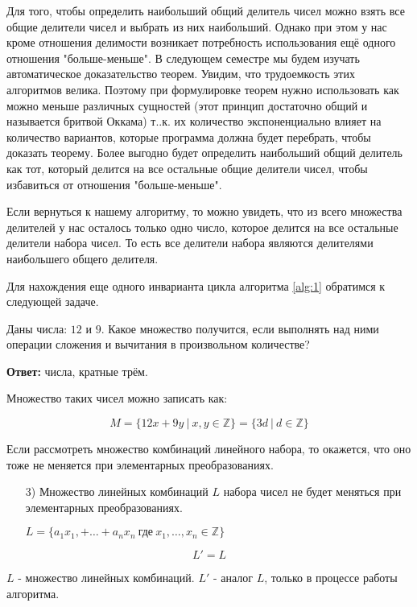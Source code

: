 \documentclass[russian]{lecture-notes}
\begin{document}
\begin{remark}
    Для того, чтобы определить наибольший общий делитель чисел можно взять все общие делители чисел и выбрать из них наибольший. Однако при этом у нас кроме отношения делимости возникает потребность использования ещё одного отношения "больше-меньше". В следующем семестре мы будем изучать автоматическое доказательство теорем. Увидим, что трудоемкость этих алгоритмов велика. Поэтому при формулировке теорем нужно использовать как можно меньше различных сущностей (этот принцип достаточно общий и называется бритвой Оккама) т..к. их количество экспоненциально влияет на количество вариантов, которые программа должна будет перебрать, чтобы доказать теорему.  Более выгодно будет определить наибольший общий делитель как тот, который делится на все остальные общие делители чисел, чтобы избавиться от отношения "больше-меньше".
\end{remark}

Если вернуться к нашему алгоритму, то можно увидеть, что из всего множества делителей у нас осталось только одно число, которое делится на все остальные делители набора чисел. То есть все делители набора являются делителями наибольшего общего делителя.

Для нахождения еще одного инварианта цикла алгоритма \ref{alg:1} обратимся к следующей задаче.

\begin{problem}
    Даны числа: $12$ и $9$. Какое множество получится, если выполнять над ними операции сложения и вычитания в произвольном количестве?
\end{problem}
\noindent \textbf{Ответ:} числа, кратные трём.

Множество таких чисел можно записать как:

\[M = \{12x+9y \ | \ x, y \in \mathbb{Z}\} = \{3d \ | \ d \in \mathbb{Z}\}\]

Если рассмотреть множество комбинаций линейного набора, то окажется, что оно тоже не меняется при элементарных преобразованиях.

\begin{itemize}
    \item[3)] Множество линейных комбинаций $L$ набора чисел не будет меняться при элементарных преобразованиях.

    \emph{$L = \{a_1x_1,+\ldots+a_nx_n \ \text{где} \ x_1,\ldots,x_n \in \mathbb{Z} \}$}
\end{itemize}
\[L'=L\]
\begin{note}
    $L$ - множество линейных комбинаций. $L'$ - аналог $L$, только в процессе работы алгоритма.
\end{note}
\end{document}
